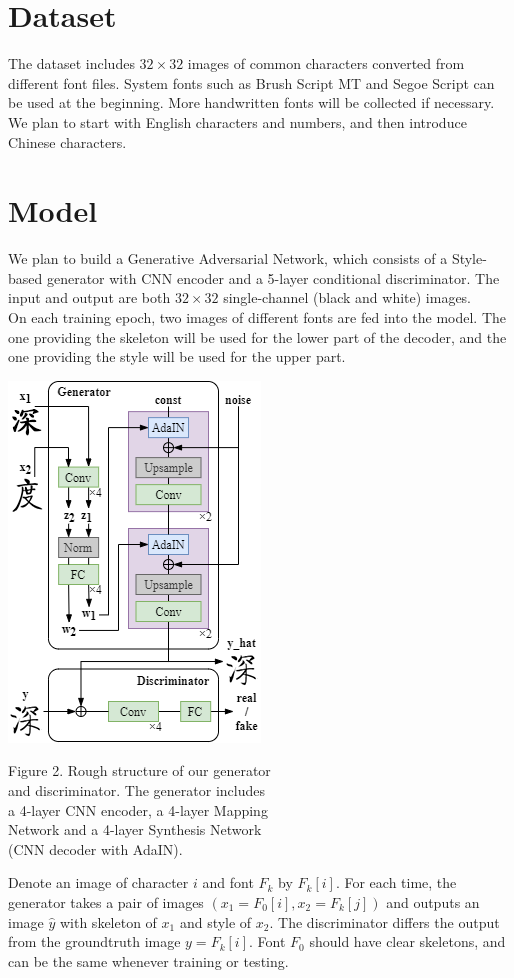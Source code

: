 \documentclass[letterpaper]{article}
\begin{document}
\section{Dataset}
The dataset includes $32 \times 32$ images of common characters converted from different font files. System fonts such as Brush Script MT and Segoe Script can be used at the beginning. More handwritten fonts will be collected if necessary. We plan to start with English characters and numbers, and then introduce Chinese characters.

\section{Model}
We plan to build a Generative Adversarial Network, which consists of a Style-based generator with CNN encoder and a 5-layer conditional discriminator. The input and output are both $32 \times 32$ single-channel (black and white) images.
\\
On each training epoch, two images of different fonts are fed into the model. The one providing the skeleton will be used for the lower part of the decoder, and the one providing the style will be used for the upper part.
\begin{center}
    \includegraphics[]{plan-fig-model.png}

    Figure 2. Rough structure of our generator\\and discriminator. The generator includes\\a 4-layer CNN encoder, a 4-layer Mapping\\Network and a 4-layer Synthesis Network\\(CNN decoder with AdaIN).
\end{center}
Denote an image of character $i$ and font $F_k$ by $F_k[i]$. For each time, the generator takes a pair of images $(x_1=F_0[i], x_2=F_k[j])$ and outputs an image $\hat{y}$ with skeleton of $x_1$ and style of $x_2$. The discriminator differs the output from the groundtruth image $y=F_k[i]$. Font $F_0$ should have clear skeletons, and can be the same whenever training or testing.
\end{document}
